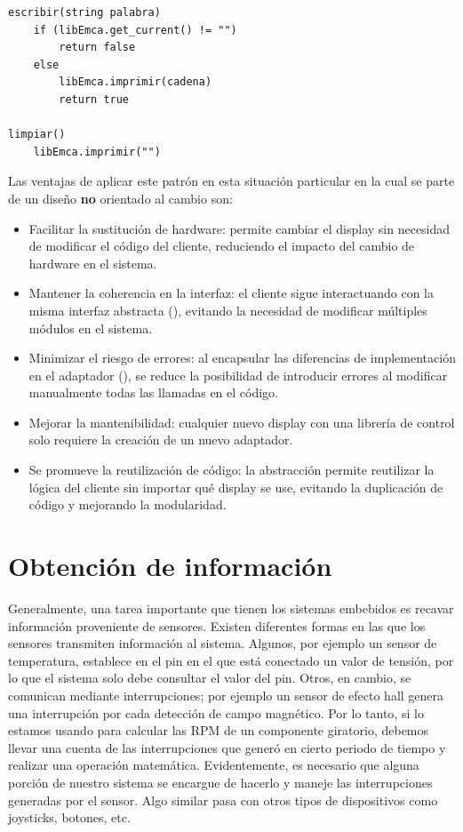 \begin{lstlisting}[label={codigoAdapter}, caption=Ejemplo de implementación del módulo \ControlEmca]
escribir(string palabra)
    if (libEmca.get_current() != "")
        return false
	else
    	libEmca.imprimir(cadena)
    	return true

limpiar()
    libEmca.imprimir("")
\end{lstlisting}

Las ventajas de aplicar este patrón en esta situación particular en la cual se parte de un diseño \textbf{no} orientado al cambio son:

\begin{itemize}

\item Facilitar la sustitución de hardware: permite cambiar el display sin necesidad de modificar el código del cliente, reduciendo el impacto del cambio de hardware en el sistema.

\item Mantener la coherencia en la interfaz: el cliente sigue interactuando con la misma interfaz abstracta (\Display), evitando la necesidad de modificar múltiples módulos en el sistema.

\item Minimizar el riesgo de errores: al encapsular las diferencias de implementación en el adaptador (\DisplayEmca), se reduce la posibilidad de introducir errores al modificar manualmente todas las llamadas en el código.

\item Mejorar la mantenibilidad: cualquier nuevo display con una librería de control solo requiere la creación de un nuevo adaptador.

\item Se promueve la reutilización de código: la abstracción permite reutilizar la lógica del cliente sin importar qué display se use, evitando la duplicación de código y mejorando la modularidad.
\end{itemize}


\section{Obtención de información}
\label{obtInfo}

Generalmente, una tarea importante que tienen los sistemas embebidos es recavar información proveniente de sensores. Existen diferentes formas en las que los sensores transmiten información al sistema. Algunos, por ejemplo un sensor de temperatura, establece en el pin en el que está conectado un valor de tensión, por lo que el sistema solo debe consultar el valor del pin. Otros, en cambio, se comunican mediante interrupciones; por ejemplo un sensor de efecto \gls{hall} genera una interrupción por cada detección de campo magnético. Por lo tanto, si lo estamos usando para calcular las \gls{RPM} de un componente giratorio, debemos llevar una cuenta de las interrupciones que generó en cierto periodo de tiempo y realizar una operación matemática. Evidentemente, es necesario que alguna porción de nuestro sistema se encargue de hacerlo y maneje las interrupciones generadas por el sensor. Algo similar pasa con otros tipos de dispositivos como joysticks, botones, etc.

